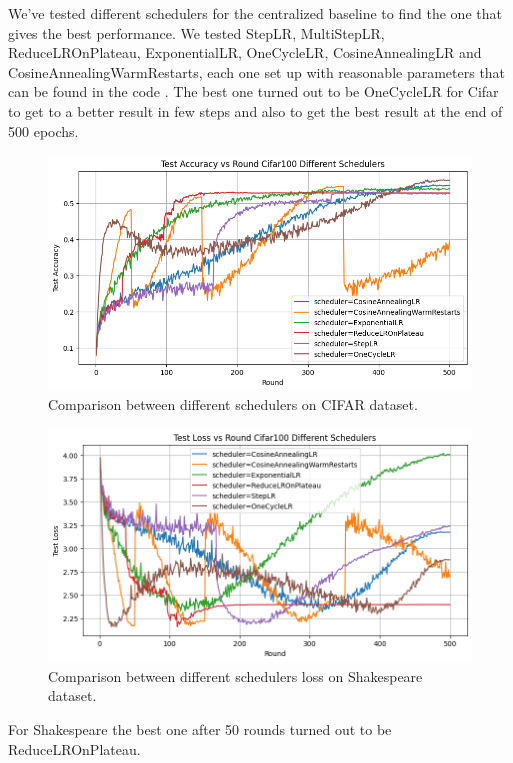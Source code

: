 \documentclass[10pt,twocolumn,letterpaper]{article}
\begin{document}
We've tested different schedulers for the centralized baseline to find the one that gives the best performance.
We tested StepLR, MultiStepLR, ReduceLROnPlateau, ExponentialLR, OneCycleLR,  CosineAnnealingLR and CosineAnnealingWarmRestarts, each one set up with reasonable parameters that can be found in the code .
The best one turned out to be OneCycleLR for Cifar to get to a better result in few steps and also to get the best result at the end of 500 epochs.

\begin{figure}[h]
\centering
\includegraphics[width=\linewidth]{images/graph_cifar.png}
\caption{Comparison between different schedulers on CIFAR dataset.}
\label{fig:short-a}
\end{figure}



\begin{figure}[h]
\centering
\includegraphics[width=\linewidth]{images/cifar_loss.png}
\caption{Comparison between different schedulers loss on Shakespeare dataset.}
\label{fig:short-b}
\end{figure}
For Shakespeare the best one after 50 rounds turned out to be ReduceLROnPlateau.
\end{document}
